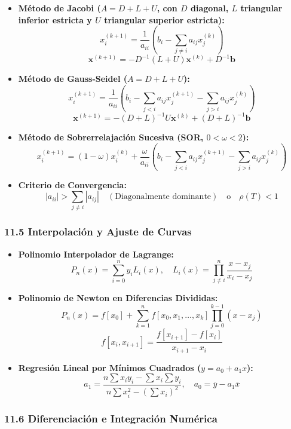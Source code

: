 \documentclass[11pt,a4paper]{article}
\begin{document}
\begin{itemize}
  \item \textbf{Método de Jacobi ($A = D + L + U$, con $D$ diagonal, $L$ triangular inferior estricta y $U$ triangular superior estricta):}
  \[
    x_i^{(k+1)} = \frac{1}{a_{ii}} \left( b_i - \sum_{j \ne i} a_{ij}x_j^{(k)} \right)
  \]
  \[
    \mathbf{x}^{(k+1)} = -D^{-1}(L + U)\mathbf{x}^{(k)} + D^{-1}\mathbf{b}
  \]
  \item \textbf{Método de Gauss-Seidel ($A = D + L + U$):}
  \[
    x_i^{(k+1)} = \frac{1}{a_{ii}} \left( b_i - \sum_{j < i} a_{ij}x_j^{(k+1)} - \sum_{j > i} a_{ij}x_j^{(k)} \right)
  \]
  \[
    \mathbf{x}^{(k+1)} = -(D + L)^{-1} U \mathbf{x}^{(k)} + (D + L)^{-1} \mathbf{b}
  \]
  \item \textbf{Método de Sobrerrelajación Sucesiva (SOR, $0 < \omega < 2$):}
  \[
    x_i^{(k+1)} = (1 - \omega)x_i^{(k)} + \frac{\omega}{a_{ii}} \left( b_i - \sum_{j < i} a_{ij}x_j^{(k+1)} - \sum_{j > i} a_{ij}x_j^{(k)} \right)
  \]
  \item \textbf{Criterio de Convergencia:}
  \[
    |a_{ii}| > \sum_{j \ne i} |a_{ij}| \quad (\text{Diagonalmente dominante}) \quad \text{o} \quad \rho(T) < 1
  \]
\end{itemize}

\subsubsection*{11.5 Interpolación y Ajuste de Curvas}

\begin{itemize}
  \item \textbf{Polinomio Interpolador de Lagrange:}
  \[
    P_n(x) = \sum_{i=0}^n y_i L_i(x), \quad L_i(x) = \prod_{j \ne i}^n \frac{x - x_j}{x_i - x_j}
  \]
  \item \textbf{Polinomio de Newton en Diferencias Divididas:}
  \[
    P_n(x) = f[x_0] + \sum_{k=1}^n f[x_0, x_1, \dots, x_k] \prod_{j=0}^{k-1} (x - x_j)
  \]
  \[
    f[x_i, x_{i+1}] = \frac{f[x_{i+1}] - f[x_i]}{x_{i+1} - x_i}
  \]
  \item \textbf{Regresión Lineal por Mínimos Cuadrados ($y = a_0 + a_1 x$):}
  \[
    a_1 = \frac{n \sum x_i y_i - \sum x_i \sum y_i}{n \sum x_i^2 - (\sum x_i)^2}, \quad a_0 = \bar{y} - a_1 \bar{x}
  \]
\end{itemize}

\subsubsection*{11.6 Diferenciación e Integración Numérica}
\end{document}
